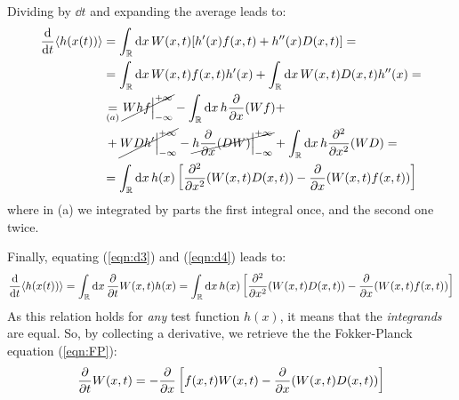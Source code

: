 \documentclass[../template.tex]{subfiles}
\begin{document}
Dividing by $\dd{t}$ and expanding the average leads to:
\begin{align}
    \dv{t} \langle h(x(t)) \rangle &= \int_{\mathbb{R}} \dd{x} W(x,t) [h'(x) f(x,t) + h''(x) D(x,t)] = 
    \nonumber\\
    &=\nonumber \int_{\mathbb{R}} \dd{x} W(x,t) f(x,t) h'(x) + \int_{\mathbb{R}} \dd{x} W(x,t) D(x,t) h''(x) =\\
    &\underset{(a)}{=}  \nonumber \cancel{W hf \Big|_{-\infty}^{+\infty}} - \int_{\mathbb{R}} \dd{x} h \pdv{x} (Wf) +\\
    &\, + \cancel{WDh'\Big|_{-\infty}^{+\infty}} -\cancel{h \pdv{x} (DW)\Big|_{-\infty}^{+\infty}} + \int_{\mathbb{R}}\dd{x} h \pdv[2]{x} (WD) = \nonumber \\
    &= \int_{\mathbb{R}} \dd{x} h(x) \left[\pdv[2]{x} (W(x,t) D(x,t)) - \pdv{x} (W(x,t) f(x,t))\right]
\end{align}
where in (a) we integrated by parts the first integral once, and the second one twice.

Finally, equating (\ref{eqn:d3}) and (\ref{eqn:d4}) leads to:
\begin{align*}
    \dv{t}\langle h(x(t)) \rangle = \int_{\mathbb{R}} \dd{x} \pdv{t}W(x,t) h(x) = \int_{\mathbb{R}} \dd{x} h(x) \left[\pdv[2]{x} (W(x,t) D(x,t)) - \pdv{x} (W(x,t) f(x,t))\right]
\end{align*}
As this relation holds for \textit{any} test function $h(x)$, it means that the \textit{integrands} are equal. So, by collecting a derivative, we retrieve the 
the Fokker-Planck equation (\ref{eqn:FP}):
\begin{align*}
    \pdv{t} W(x,t) = - \pdv{x} \left[f(x,t) W(x,t) - \pdv{x} (W(x,t) D(x,t))\right]
\end{align*}  
\end{document}
